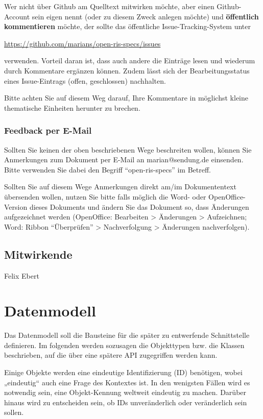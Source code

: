 \documentclass[,a4paper]{article}
\begin{document}
Wer nicht über Github am Quelltext mitwirken möchte, aber einen
Github-Account sein eigen nennt (oder zu diesem Zweck anlegen möchte)
und \textbf{öffentlich kommentieren} möchte, der sollte das öffentliche
Issue-Tracking-System unter

\href{https://github.com/marians/open-ris-specs/issues}{https://github.com/marians/open-ris-specs/issues}

verwenden. Vorteil daran ist, dass auch andere die Einträge lesen und
wiederum durch Kommentare ergänzen können. Zudem lässt sich der
Bearbeitungsstatus eines Issue-Eintrags (offen, geschlossen) nachhalten.

Bitte achten Sie auf diesem Weg darauf, Ihre Kommentare in möglichst
kleine thematische Einheiten herunter zu brechen.

\subsubsection{Feedback per E-Mail}

Sollten Sie keinen der oben beschriebenen Wege beschreiten wollen,
können Sie Anmerkungen zum Dokument per E-Mail an marian@sendung.de
einsenden. Bitte verwenden Sie dabei den Begriff ``open-ris-specs'' im
Betreff.

Sollten Sie auf diesem Wege Anmerkungen direkt am/im Dokumententext
übersenden wollen, nutzen Sie bitte falls möglich die Word- oder
OpenOffice-Version dieses Dokuments und ändern Sie das Dokument so, dass
Änderungen aufgezeichnet werden (OpenOffice: Bearbeiten \textgreater{}
Änderungen \textgreater{} Aufzeichnen; Word: Ribbon ``Überprüfen''
\textgreater{} Nachverfolgung \textgreater{} Änderungen nachverfolgen).

\subsection{Mitwirkende}

Felix Ebert

\section{Datenmodell}

Das Datenmodell soll die Bausteine für die später zu entwerfende
Schnittstelle definieren. Im folgenden werden sozusagen die Objekttypen
bzw. die Klassen beschrieben, auf die über eine spätere API zugegriffen
werden kann.

Einige Objekte werden eine eindeutige Identifizierung (ID) benötigen,
wobei „eindeutig`` auch eine Frage des Kontextes ist. In den wenigsten
Fällen wird es notwendig sein, eine Objekt-Kennung weltweit eindeutig zu
machen. Darüber hinaus wird zu entscheiden sein, ob IDs unveränderlich
oder veränderlich sein sollen.
\end{document}
